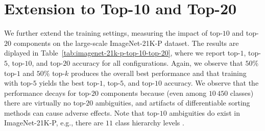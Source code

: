 \documentclass{article}
\begin{document}




\newpage
\appendix




\section{Extension to Top-10 and Top-20}
\label{apx:extension-10-20}

We further extend the training settings, measuring the impact of top-$10$ and top-$20$ components on the large-scale ImageNet-21K-P dataset. 
The results are diplayed in Table~\ref{tab:imagenet-21k-p-top-10-top-20}, where we report top-$1$, top-$5$, top-$10$, and top-$20$ accuracy for all configurations. 
Again, we observe that $50\%$ top-$1$ and $50\%$ top-$k$ produces the overall best performance and that training with top-$5$ yields the best top-$1$, top-$5$, and top-$10$ accuracy.
We observe that the performance decays for top-$20$ components because (even among $10\,450$ classes) there are virtually no top-$20$ ambiguities, and artifacts of differentiable sorting methods can cause adverse effects.
Note that top-$10$ ambiguities do exist in ImageNet-21K-P, e.g., there are $11$ class hierarchy levels \cite{ridnik2021imagenet}.
\end{document}
